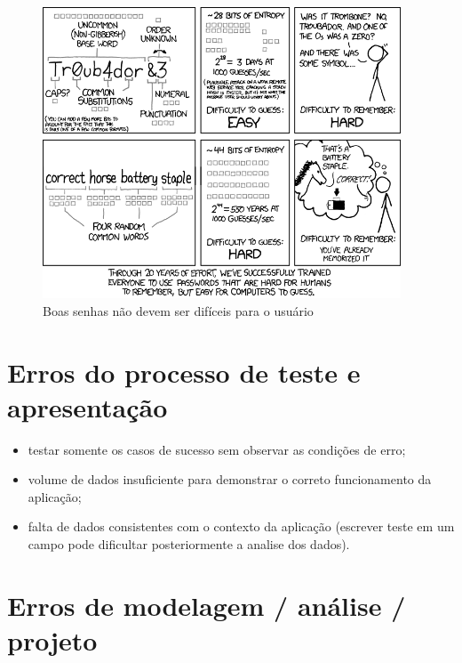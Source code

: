 \begin{figure}
    \centering
	\includegraphics[width=0.95\textwidth]{erros/password_strength.png}
    \caption{Boas senhas não devem ser difíceis para o usuário}
    \label{fig:password_strength}
\end{figure}


\section{Erros do processo de teste e apresentação}

\begin{itemize}

    \item testar somente os casos de sucesso sem observar as condições de erro;
    
    \item volume de dados insuficiente para demonstrar o correto funcionamento da aplicação;
    
    \item falta de dados consistentes com o contexto da aplicação (escrever teste em um campo pode dificultar posteriormente a analise dos dados).
    
\end{itemize}

\section{Erros de modelagem / análise / projeto}

